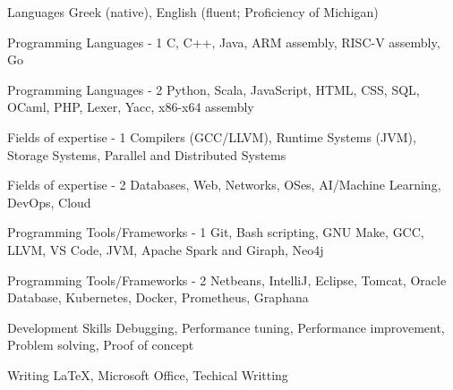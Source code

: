 

\begin{cvskills}

  \cvskill
    {Languages} %
    {Greek (native), English (fluent; Proficiency of Michigan)} %

  \cvskill
    {Programming Languages - 1} %
    {C, C++, Java, ARM assembly, RISC-V assembly, Go} %

  \cvskill
    {Programming Languages - 2} %
    {Python, Scala, JavaScript, HTML, CSS, SQL, OCaml, PHP, Lexer, Yacc, x86-x64 assembly}

  \cvskill
    {Fields of expertise - 1} %
    {Compilers (GCC/LLVM), Runtime Systems (JVM), Storage Systems, Parallel and Distributed Systems} %
    
  \cvskill
    {Fields of expertise - 2} %
    {Databases, Web, Networks, OSes, AI/Machine Learning, DevOps, Cloud}

  \cvskill
    {Programming Tools/Frameworks - 1} %
    {Git, Bash scripting, GNU Make, GCC, LLVM, VS Code, JVM, Apache Spark and Giraph, Neo4j}

  \cvskill
    {Programming Tools/Frameworks - 2} %
    {Netbeans, IntelliJ, Eclipse, Tomcat, Oracle Database, Kubernetes, Docker, Prometheus, Graphana} %

  \cvskill
    {Development Skills} %
    {Debugging, Performance tuning, Performance improvement, Problem solving, Proof of concept} %

  \cvskill
    {Writing} %
    {LaTeX, Microsoft Office, Techical Writting} %

\end{cvskills}
